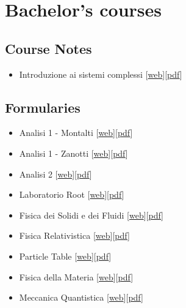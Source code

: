 \documentclass{article}
\begin{document}
\section{Bachelor's courses}

\subsection{Course Notes}

\begin{itemize}
    \item Introduzione ai sistemi complessi [\href{source/b_introduzione_sistemi_complessi.html}{web}][\href{https://github.com/Grufoony/Fisica_Unibo/tree/gh-pages/source/b_introduzione_sistemi_complessi.pdf}{pdf}]
\end{itemize}

\subsection{Formularies}

\begin{itemize}
    \item Analisi 1 - Montalti [\href{source/b_formulario_analisi_1_mon.html}{web}][\href{https://github.com/Grufoony/Fisica_Unibo/tree/gh-pages/source/b_formulario_analisi_1_mon.pdf}{pdf}]
    \item Analisi 1 - Zanotti [\href{source/b_formulario_analisi_1_zan.html}{web}][\href{https://github.com/Grufoony/Fisica_Unibo/tree/gh-pages/source/b_formulario_analisi_1_zan.pdf}{pdf}]
    \item Analisi 2 [\href{source/b_formulario_analisi_2.html}{web}][\href{https://github.com/Grufoony/Fisica_Unibo/tree/gh-pages/source/b_formulario_analisi_2.pdf}{pdf}]
    \item Laboratorio Root [\href{source/b_formulario_laboratorio_root.html}{web}][\href{https://github.com/Grufoony/Fisica_Unibo/tree/gh-pages/source/b_formulario_laboratorio_root.pdf}{pdf}]
    \item Fisica dei Solidi e dei Fluidi [\href{source/b_formulario_fisica_dei_solidi_e_dei_fluidi.html}{web}][\href{https://github.com/Grufoony/Fisica_Unibo/tree/gh-pages/source/b_formulario_fisica_dei_solidi_e_dei_fluidi.pdf}{pdf}]
    \item Fisica Relativistica [\href{source/b_formulario_fisica_relativistica.html}{web}][\href{https://github.com/Grufoony/Fisica_Unibo/tree/gh-pages/source/b_formulario_fisica_relativistica.pdf}{pdf}]
    \item Particle Table [\href{source/b_formulario_particle_table.html}{web}][\href{https://github.com/Grufoony/Fisica_Unibo/tree/gh-pages/source/b_formulario_particle_table.pdf}{pdf}]
    \item Fisica della Materia [\href{source/b_formulario_materia.html}{web}][\href{https://github.com/Grufoony/Fisica_Unibo/tree/gh-pages/source/b_formulario_materia.pdf}{pdf}]
    \item Meccanica Quantistica [\href{source/b_formulario_meccanica_quantistica.html}{web}][\href{https://github.com/Grufoony/Fisica_Unibo/tree/gh-pages/source/b_formulario_meccanica_quantistica.pdf}{pdf}]
\end{itemize}
\end{document}

